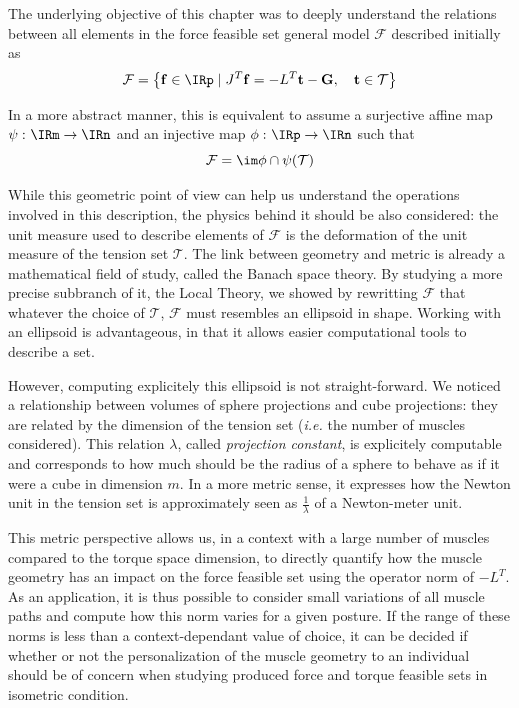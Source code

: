 \label{sec:approx_discussion}

The underlying objective of this chapter was to deeply understand the relations between all elements in the force feasible set general model $\mathcal{F}$ described initially as
$$\mathcal{F} = \left\{ \mathbf{f}\in \IRp \mid J^T\mathbf{f} = -L^T\mathbf{t} - \mathbf{G},\quad \mathbf{t}\in \mathcal{T} \right\}$$

In a more abstract manner, this is equivalent to assume a surjective affine map $\psi\,\colon \IRm\rightarrow \IRn$ and an injective map $\phi\,\colon \IRp\rightarrow \IRn$ such that 
$$\mathcal{F} = \im \phi \cap \psi(\mathcal{T})$$

While this geometric point of view can help us understand the operations involved in this description, the physics behind it should be also considered: the unit measure used to describe elements of $\mathcal{F}$ is the deformation of the unit measure of the tension set $\mathcal{T}$. The link between geometry and metric is already a mathematical field of study, called the Banach space theory. By studying a more precise subbranch of it, the Local Theory, we showed by rewritting $\mathcal{F}$ that whatever the choice of $\mathcal{T}$, $\mathcal{F}$ must resembles an ellipsoid in shape. Working with an ellipsoid is advantageous, in that it allows easier computational tools to describe a set.

However, computing explicitely this ellipsoid is not straight-forward. We noticed a relationship between volumes of sphere projections and cube projections: they are related by the dimension of the tension set (\emph{i.e.} the number of muscles considered). This relation $\lambda$, called \emph{projection constant}, is explicitely computable and corresponds to how much should be the radius of a sphere to behave as if it were a cube in dimension $m$. In a more metric sense, it expresses how the Newton unit in the tension set is approximately seen as $\frac{1}{\lambda}$ of a Newton-meter unit.

This metric perspective allows us, in a context with a large number of muscles compared to the torque space dimension, to directly quantify how the muscle geometry has an impact on the force feasible set using the operator norm of $-L^T$. As an application, it is thus possible to consider small variations of all muscle paths and compute how this norm varies for a given posture. If the range of these norms is less than a context-dependant value of choice, it can be decided if whether or not the personalization of the muscle geometry to an individual should be of concern when studying produced force and torque feasible sets in isometric condition. 


